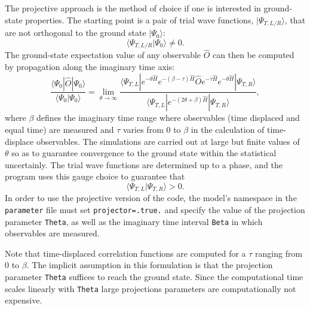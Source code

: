 

The projective  approach is the method of choice if  one is interested in ground-state properties.     The starting point is a pair of trial wave functions,  $| \Psi_{T,L/R} \rangle  $,  that are  not orthogonal to the ground state $| \Psi_0 \rangle $:
\begin{equation}
  \langle \Psi_{T,L/R}  | \Psi_0 \rangle  \neq 0. 
\end{equation}
The ground-state expectation value of  any  observable  $\hat{O} $ can then be computed by  propagation along the imaginary time axis:
  \begin{equation}
	 \frac{ \langle \Psi_0 | \hat{O} | \Psi_0 \rangle }{ \langle \Psi_0 | \Psi_0 \rangle}   = \lim_{\theta \rightarrow \infty}  
	 \frac{ \langle \Psi_{T,L} | e^{-\theta \hat{H}}  e^{-(\beta - \tau)\hat{H}  }\hat{O} e^{- \tau  \hat{H} }   e^{-\theta \hat{H}} | \Psi_{T,R} \rangle } 
	        { \langle \Psi_{T,L} | e^{-(2 \theta + \beta) \hat{H}  } | \Psi_{T,R} \rangle } ,
\end{equation}
where $\beta$ defines the imaginary time range where observables (time displaced and equal time) are measured and $\tau$ varies from $0$ to $\beta$ in the calculation of time-displace observables.
The simulations are carried out at large  but finite values of  $\theta$ so as to guarantee convergence to the ground  state within the statistical uncertainly.
The trial wave functions are determined up to a phase, and the program uses this gauge choice to  guarantee that
\begin{equation}
	 \langle \Psi_{T,L} | \Psi_{T,R} \rangle  > 0.
\end{equation}
In order to use the projective version of the code, the model's namespace in the \texttt{parameter} file must set \texttt{projector=.true.} and specify the value of the projection parameter \texttt{Theta}, as well as the imaginary time interval \texttt{Beta} in which observables are measured.

Note that time-displaced correlation functions  are computed for a $\tau$ ranging from $0$ to $\beta$.  The implicit assumption  in this formulation is that  the projection  parameter  \texttt{Theta}  suffices to reach the ground state.    Since the  computational time scales linearly with  \texttt{Theta}   large projections parameters are computationally not expensive. 


